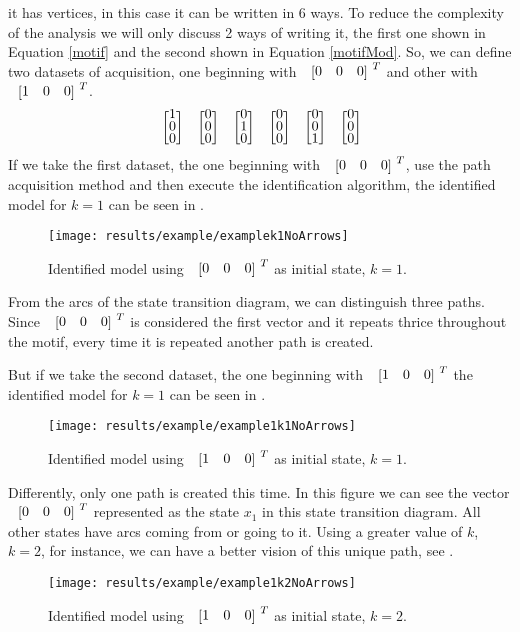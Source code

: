 it has vertices, in this case it can be written in 6 ways. To reduce the
complexity of the analysis we will only discuss 2 ways of writing it, the first
one shown in Equation
\ref{motif} and the second shown in Equation \ref{motifMod}. So, we can define two datasets of acquisition,
one beginning with $\colvec{0&0&0}^T$ and other with $\colvec{1&0&0}^T$.
\begin{align}
  \label{motifMod}
\colvec{1\\0\\0}\colvec{0\\0\\0}\colvec{0\\1\\0}\colvec{0\\0\\0}\colvec{0\\0\\1}\colvec{0\\0\\0}
\end{align}
If we take the first dataset, the one beginning with $\colvec{0&0&0}^T$, use the
path acquisition method and then
execute the identification algorithm, the identified model for $k=1$ can be
seen in . 
\begin{figure}[H]
  \centering
 \texttt{[image: results/example/examplek1NoArrows]}
  \caption{Identified model using $\colvec{0&0&0}^T$ as initial state, $k=1$.}
    \label{fig:exampleCol000k1}
\end{figure}
From the arcs of the state transition diagram, we can distinguish three paths. Since
$\colvec{0&0&0}^T$ is considered the first vector and it repeats thrice
throughout the motif, every time it is repeated another path is created.

But if we take the second dataset, the one beginning with $\colvec{1&0&0}^T$ the identified model for $k=1$ can be
seen in . 
\begin{figure}[H]
  \centering
  \texttt{[image: results/example/example1k1NoArrows]}
  \caption{Identified model using $\colvec{1&0&0}^T$ as initial state, $k=1$.}
    \label{fig:exampleCol100k1}
\end{figure}
Differently, only one path is created this time. In this figure we can see the vector $\colvec{0&0&0}^T$ represented as the state
$x_1$ in this state transition diagram. All other states have arcs coming
from or going to it. Using a greater value of $k$, $k=2$, for instance, we can have a
better vision of this unique path, see .
\begin{figure}[H]
  \centering
  \texttt{[image: results/example/example1k2NoArrows]}
  \caption{Identified model using $\colvec{1&0&0}^T$ as initial state, $k=2$.}
    \label{fig:exampleCol100k2}
  \end{figure}

